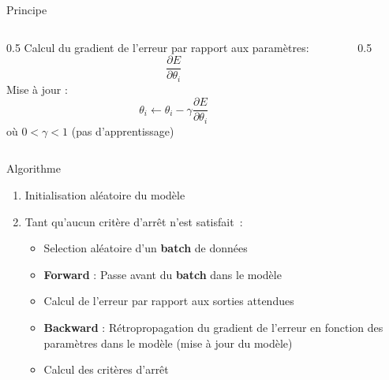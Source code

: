 
\begin{frame}{Principe}
  \begin{columns}
    \begin{column}{0.5\tw}
      Calcul du gradient de l'erreur par rapport aux paramètres:
      \[
        \frac{\partial{E}}{\partial{\theta_i}}
      \]
      Mise à jour :
      \[
        \theta_i \leftarrow \theta_i - \gamma\frac{\partial{E}}{\partial{\theta_i}}
      \]
      où $0 < \gamma < 1$ (pas d'apprentissage)
    \end{column}
    \begin{column}{0.5\tw}
    \end{column}
  \end{columns}
\end{frame}

\begin{frame}{Algorithme}
  \begin{enumerate}[<+->]
    \item Initialisation aléatoire du modèle
    \item Tant qu'aucun critère d'arrêt n'est satisfait~:
      \begin{itemize}
        \item Selection aléatoire d'un \textbf{batch} de données
        \item \textbf{Forward} : Passe avant du \textbf{batch} dans le modèle
        \item Calcul de l'erreur par rapport aux sorties attendues
        \item \textbf{Backward} : Rétropropagation du gradient de l'erreur en fonction des paramètres dans le modèle (mise à jour du modèle)
        \item Calcul des critères d'arrêt
      \end{itemize}
  \end{enumerate}
\end{frame}


